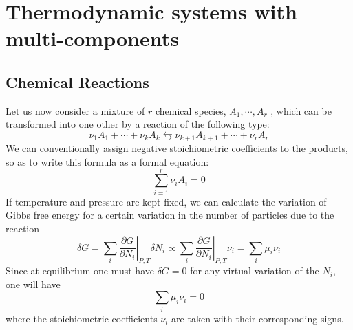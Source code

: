 \documentclass[cyan]{elegantnote}
\begin{document}
\section{Thermodynamic systems with multi-components}
\subsection{Chemical Reactions}
Let us now consider a mixture of $r$ chemical species, $A_1,\cdots,A_r$ , which can be transformed into one other by a reaction of the following type:
\[\nu_1A_1+\cdots+\nu_kA_k　\leftrightarrows　\nu_{k+1}A_{k+1}+\cdots+\nu_rA_r\]
We can conventionally assign negative stoichiometric coefficients to the products, so as to write this formula as a formal equation:
\[\sum_{i=1}^r \nu_iA_i = 0\]
If temperature and pressure are kept fixed, we can calculate the variation of Gibbs free energy for a certain variation in the number of particles due to the reaction
\[\delta G = \sum_i \left. \frac{\partial G}{\partial N_i} \right|_{P,T} \delta N_i \propto \sum_i \left. \frac{\partial G}{\partial N_i} \right|_{P,T} \nu_i = \sum_{i} \mu_i\nu_i\]
Since at equilibrium one must have $\delta G = 0$ for any virtual variation of the $N_i$, one will have
\[\sum_{i} \mu_i\nu_i = 0\]
where the stoichiometric coefficients $\nu_i$ are taken with their corresponding signs.
\end{document}
